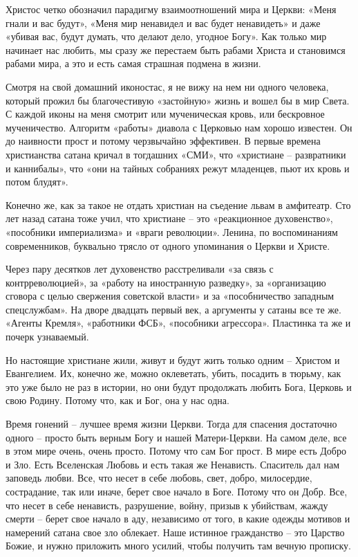 Христос четко обозначил парадигму взаимоотношений мира и Церкви: «Меня гнали и
вас будут», «Меня мир ненавидел и вас будет ненавидеть» и даже «убивая вас,
будут думать, что делают дело, угодное Богу». Как только мир начинает нас
любить, мы сразу же перестаем быть рабами Христа и становимся рабами мира, а
это и есть самая страшная подмена в жизни.

Смотря на свой домашний иконостас, я не вижу на нем ни одного человека, который
прожил бы благочестивую «застойную» жизнь и вошел бы в мир Света. С каждой
иконы на меня смотрит или мученическая кровь, или бескровное мученичество.
Алгоритм «работы» диавола с Церковью нам хорошо известен.  Он до наивности
прост и потому черзвычайно эффективен. В первые времена христианства сатана
кричал в тогдашних «СМИ», что «христиане – развратники и каннибалы»,  что «они
на тайных собраниях режут младенцев, пьют их кровь и потом блудят».

Конечно же, как за такое не отдать христиан на съедение львам в амфитеатр. Сто
лет назад сатана тоже учил, что христиане – это  «реакционное духовенство»,
«пособники империализма» и «враги революции». Ленина, по воспоминаниям
современников, буквально трясло от одного упоминания о Церкви и Христе. 

Через пару десятков лет духовенство расстреливали «за связь с контрреволюцией»,
за «работу на иностранную разведку», за «организацию сговора с целью свержения
советской власти» и за  «пособничество западным спецслужбам». На дворе двадцать
первый век, а аргументы у сатаны все те же. «Агенты Кремля», «работники ФСБ»,
«пособники агрессора». Пластинка та же и почерк узнаваемый.

Но настоящие христиане жили, живут и будут жить только одним – Христом и
Евангелием. Их, конечно же, можно оклеветать, убить, посадить в тюрьму, как это
уже было не раз в истории, но они будут продолжать любить Бога, Церковь и свою
Родину. Потому что, как и Бог, она у нас одна.

Время гонений – лучшее время жизни Церкви. Тогда для спасения достаточно одного
– просто быть верным Богу и нашей Матери-Церкви. На самом деле, все в этом мире
очень, очень просто. Потому что сам Бог прост. В мире есть Добро и Зло. Есть
Вселенская Любовь и есть такая же Ненависть. Спаситель дал нам заповедь любви.
Все, что несет в себе любовь, свет, добро, милосердие, сострадание, так или
иначе, берет свое начало в Боге. Потому что он Добр. Все, что несет в себе
ненависть, разрушение, войну, призыв к убийствам, жажду смерти – берет свое
начало в аду, независимо от того, в какие одежды мотивов и намерений сатана
свое зло облекает. Наше истинное гражданство – это Царство Божие, и нужно
приложить много усилий, чтобы получить там вечную прописку.

